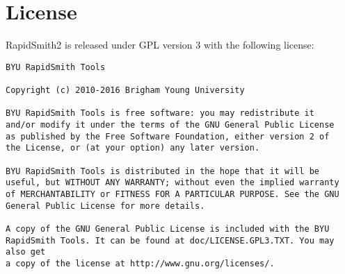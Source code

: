 \newpage
\section{License}
RapidSmith2 is released under GPL version 3 with the following license: 

\begin{verbatim}
BYU RapidSmith Tools

Copyright (c) 2010-2016 Brigham Young University
   
BYU RapidSmith Tools is free software: you may redistribute it
and/or modify it under the terms of the GNU General Public License
as published by the Free Software Foundation, either version 2 of
the License, or (at your option) any later version.
   
BYU RapidSmith Tools is distributed in the hope that it will be
useful, but WITHOUT ANY WARRANTY; without even the implied warranty
of MERCHANTABILITY or FITNESS FOR A PARTICULAR PURPOSE. See the GNU
General Public License for more details.
   
A copy of the GNU General Public License is included with the BYU
RapidSmith Tools. It can be found at doc/LICENSE.GPL3.TXT. You may also get
a copy of the license at http://www.gnu.org/licenses/.
\end{verbatim}